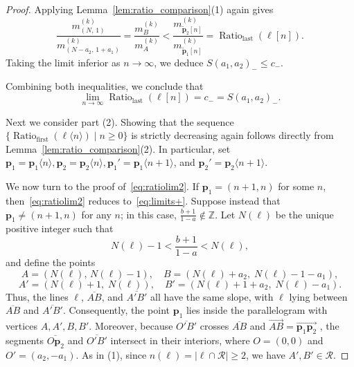 \documentclass{article}
\theoremstyle{remark}
\begin{document}
\begin{proof}
    
    Applying Lemma~\ref{lem:ratio_comparison}(1) again gives
    \begin{equation*}
        \frac{m^{(k)}_{(N,\, 1)}}{m^{(k)}_{(N - a_2,\, 1 + a_1)}}
        = \frac{m^{(k)}_B}{m^{(k)}_A}
        < \frac{m^{(k)}_{\widetilde{\mathbf{p}}_2[n]}}{m^{(k)}_{\widetilde{\mathbf{p}}_1[n]}}
        = \operatorname{Ratio}_{\mathrm{last}}(\ell[n]).
    \end{equation*}
    Taking the limit inferior as $n \to \infty$, we deduce $S(a_1, a_2)_- \leq c_-$.

    Combining both inequalities, we conclude that
    \[
        \lim_{n \to \infty} \operatorname{Ratio}_{\mathrm{last}}(\ell[n]) = c_- = S(a_1, a_2)_-.
    \]

Next we consider part (2). Showing that the sequence $\{\operatorname{Ratio}_{\mathrm{first}}(\ell\langle n\rangle) \mid n \geq 0\}$ is strictly decreasing again follows directly from Lemma~\ref{lem:ratio_comparison}(2).  In particular, set $\mathbf{p}_1 = \mathbf{p}_1\langle n\rangle,\mathbf{p}_2 = \mathbf{p}_2\langle n\rangle, \mathbf{p}_1' = \mathbf{p}_1\langle n+1 \rangle$, and $\mathbf{p}_2' = \mathbf{p}_2\langle n+1\rangle$. 

We now turn to the proof of~\eqref{eq:ratiolim2}.  
If ${\mathbf p}_1 = (n+1,n)$ for some $n$, then~\eqref{eq:ratiolim2} reduces to~\eqref{eq:limits+}.  
Suppose instead that ${\mathbf p}_1 \neq (n+1,n)$ for any $n$; in this case, $\frac{b+1}{1-a}\notin \mathbb Z$. Let $N(\ell)$ be the unique positive integer such that
\[
N(\ell) - 1 < \frac{b+1}{1-a} < N(\ell),
\]
and define the points
\[
A = (N(\ell), \, N(\ell)-1),\quad B = (N(\ell) + a_2,\; N(\ell)-1-a_1),
\]
\[
A' = (N(\ell)+1, \; N(\ell)),\quad B' = (N(\ell) +1 + a_2,\; N(\ell)-a_1).
\]
Thus, the lines $\ell$, $\overline{AB}$, and $\overline{A'B'}$ all have the same slope, with $\ell$ lying between $\overline{AB}$ and $\overline{A'B'}$. Consequently, the point ${\mathbf{p}}_1$ lies inside the parallelogram with vertices $A, A', B, B'$. Moreover, because $\overline{O'B'}$ crosses $\overline{AB}$ and
$\overrightarrow{AB} = \overrightarrow{\mathbf p_1 \mathbf p_2}$
, the segments $\overline{O{\mathbf{p}}_2}$ and $\overline{O'B'}$ intersect in their interiors, where $O = (0,0)$ and $O' = (a_2, -a_1)$. As in (1), since $n(\ell) = |\ell \cap \mathcal R| \geq 2$, we have $A', B' \in \mathcal R$.


\end{proof}
\end{document}

